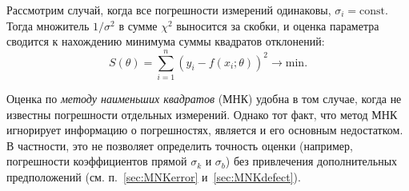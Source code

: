Рассмотрим случай, когда все погрешности измерений одинаковы,
$\sigma_i=\mathrm{const}$. Тогда множитель $1/\sigma^2$ в сумме $\chi^2$
выносится за скобки, и оценка параметра сводится к нахождению минимума суммы
квадратов отклонений:
\begin{equation}
S(\theta) = \sum_{i=1}^n \left(y_i - f(x_i;\theta)\right)^2 \to \mathrm{min}.
\end{equation}


Оценка по \emph{методу наименьших квадратов} (МНК) удобна в том случае,
когда не известны погрешности отдельных измерений. Однако тот  факт, что
метод МНК игнорирует информацию о погрешностях, является и его основным
недостатком. В частности, это не позволяет определить точность оценки
(например, погрешности коэффициентов прямой $\sigma_k$ и
$\sigma_b$) без привлечения дополнительных предположений
(см. п.~\ref{sec:MNKerror} и~\ref{sec:MNKdefect}).



%


